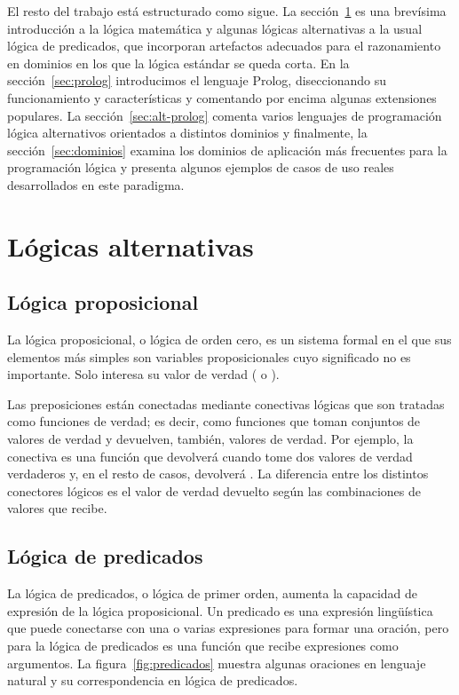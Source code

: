 \documentclass[11pt,captions=nooneline,DIV=14, parskip=full]{scrartcl}
\begin{document}
El resto del trabajo está estructurado como sigue. La sección~\ref{sec:alt-logic} es una brevísima introducción a la lógica matemática y algunas lógicas alternativas a la usual lógica de predicados, que incorporan artefactos adecuados para el razonamiento en dominios en los que la lógica estándar se queda corta. En la sección~\ref{sec:prolog} introducimos el lenguaje Prolog, diseccionando su funcionamiento y características y comentando por encima algunas extensiones populares. La sección~\ref{sec:alt-prolog} comenta varios lenguajes de programación lógica alternativos orientados a distintos dominios y finalmente, la sección~\ref{sec:dominios} examina los dominios de aplicación más frecuentes para la programación lógica y presenta algunos ejemplos de casos de uso reales desarrollados en este paradigma.

\section{Lógicas alternativas}
\label{sec:alt-logic}

\subsection{Lógica proposicional}

La lógica proposicional, o lógica de orden cero, es un sistema formal en el que sus elementos más simples son variables proposicionales cuyo significado no es importante. Solo interesa su valor de verdad ( o ).

Las preposiciones están conectadas mediante conectivas lógicas que son tratadas como funciones de verdad; es decir, como funciones que toman conjuntos de valores de verdad y devuelven, también, valores de verdad. Por ejemplo, la conectiva  es una función que devolverá  cuando tome dos valores de verdad verdaderos y, en el resto de casos, devolverá . La diferencia entre los distintos conectores lógicos es el valor de verdad devuelto según las combinaciones de valores que recibe.

\subsection{Lógica de predicados}

La lógica de predicados, o lógica de primer orden, aumenta la capacidad de expresión de la lógica proposicional. Un predicado es una expresión lingüística que puede conectarse con una o varias expresiones para formar una oración, pero para la lógica de predicados es una función que recibe expresiones como argumentos. La figura~\ref{fig:predicados} muestra algunas oraciones en lenguaje natural y su correspondencia en lógica de predicados.
\end{document}
